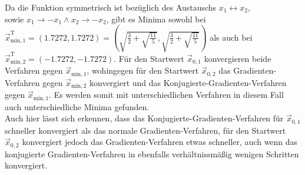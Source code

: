 Da die Funktion symmetrisch ist bezüglich des Austauschs
$x_1 \longleftrightarrow x_2$, \\ sowie
${x_1 \to -x_1 \wedge x_2 \to -x_2}$, gibt es Minima sowohl bei\\ ${\vec{x}_{\text{min},1}^{\text{T}}=(1.7272,1.7272)=(\sqrt{\frac{3}{2}+\sqrt{\frac{11}{5}}},\sqrt{\frac{3}{2}+\sqrt{\frac{11}{5}}})}$ als auch bei \\
${\vec{x}_{\text{min},2}^{\text{T}}=(-1.7272,-1.7272)}$.
Für den Startwert $\vec{x}_{0,1}$ konvergieren beide Verfahren gegen $\vec{x}_{\text{min},1}$, wohingegen für den
Startwert $\vec{x}_{0,2}$ das Gradienten-Verfahren gegen $\vec{x}_{\text{min},2}$ konvergiert und das Konjugierte-Gradienten-Verfahren gegen $\vec{x}_{\text{min},1}$. Es werden somit mit unterschiedlichen Verfahren in diesem Fall auch unterschiedliche Minima gefunden. \\
Auch hier lässt sich erkennen, dass das Konjugierte-Gradienten-Verfahren für $\vec{x}_{0,1}$ schneller konvergiert als das normale Gradienten-Verfahren, für den Startwert $\vec{x}_{0,2}$ konvergiert jedoch das Gradienten-Verfahren etwas schneller, auch wenn das konjugierte Gradienten-Verfahren in ebenfalls verhältnissmäßig wenigen Schritten konvergiert.
